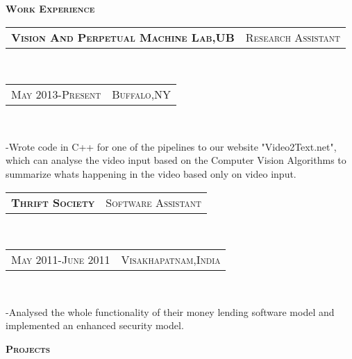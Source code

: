 \documentclass[10pt,a4paper,oneside]{article}
\begin{document}
    \begin{minipage}[t]{0.63\textwidth}
        \vspace{0pt}
        \textcolor{light-gray}{\textbf{\large W\textsc{ork} E\textsc{xperience}}}
        \vspace{10pt}\\
        \begin{tabular}{c|c}
            \textbf{\normalsize V\textsc{ision} A\textsc{nd} P\textsc{erpetual} M\textsc{achine} L\textsc{ab},UB}
            &\textmd{\normalsize R\textsc{esearch} A\textsc{ssistant}}
        \end{tabular}\\
        \textcolor{light-gray}{
            \begin{tabular}{c|c}
                {\small M\textsc{ay 2013}-P\textsc{resent}}
               &{\small B\textsc{uffalo},NY}
            \end{tabular}
        }\\ 
        \vspace{-4mm}
        \begin{adjustwidth}{7pt}{0pt}
        {\footnotesize -Wrote code in C++ for one of the pipelines to our website "Video2Text.net", which can analyse 
    the video input based on the Computer Vision Algorithms to
summarize whats happening in the video based only on video input.}\\
        \end{adjustwidth}
        \begin{tabular}{c|c}
            \textbf{\normalsize T\textsc{hrift} S\textsc{ociety}}
            &\textmd{\normalsize S\textsc{oftware} A\textsc{ssistant}}
        \end{tabular}\\
        \textcolor{light-gray}{
            \begin{tabular}{c|c}
                {\small M\textsc{ay 2011}-J\textsc{une 2011}}
                &{\small V\textsc{isakhapatnam},I\textsc{ndia}}
            \end{tabular}
        }\\ 
        \vspace{-4mm}
        \begin{adjustwidth}{7pt}{0pt}
        {\footnotesize -Analysed the whole functionality of their money lending software model and implemented an enhanced security
        model.}\\
        \end{adjustwidth}
        \textcolor{light-gray}{\textbf{\large P\textsc{rojects}}}

\end{minipage}
\end{document}
